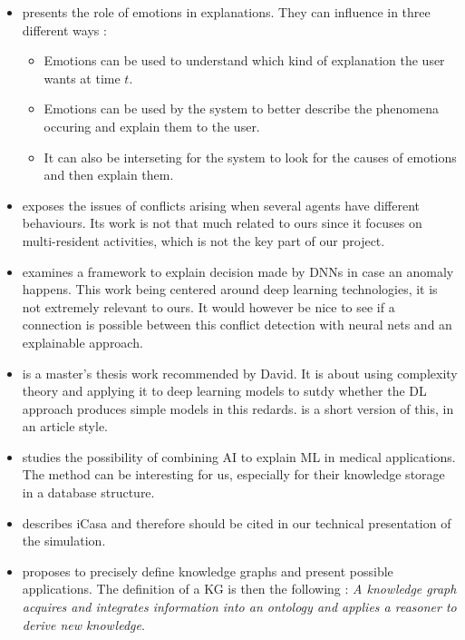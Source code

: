\documentclass{article}
\begin{document}
\begin{itemize}
    \item\citep{kaptein2017emotion} presents the role of emotions in explanations. They can influence in three different ways :
    \begin{itemize}
        \item Emotions can be used to understand which kind of explanation the user wants at time $t$.
        \item Emotions can be used by the system to better describe the phenomena occuring and explain them to the user.
        \item It can also be interseting for the system to look for the causes of emotions and then explain them.
    \end{itemize}
    
    \item\citep{mohamed2017conflict} exposes the issues of conflicts arising when several agents have different behaviours. Its work is not that much related to ours since it focuses on multi-resident activities, which is not the key part of our project.

    \item\citep{amarasinghe2018toward} examines a framework to explain decision made by DNNs in case an anomaly happens. This work being centered around deep learning technologies, it is not extremely relevant to ours. It would however be nice to see if a connection is possible between this conflict detection with neural nets and an explainable approach.

    \item\citep{blier2017universal} is a master's thesis work recommended by David. It is about using complexity theory and applying it to deep learning models to sutdy whether the DL approach produces simple models in this redards. \citep{blierdescription} is a short version of this, in an article style.

    \item \citep{olson2018system} studies the possibility of combining AI to explain ML in medical applications. The method can be interesting for us, especially for their knowledge storage in a database structure.

    \item \citep{lalanda2014icasa} describes iCasa and therefore should be cited in our technical presentation of the simulation.

    \item \citep{ehrlinger2016towards} proposes to precisely define knowledge graphs and present possible applications. The definition of a KG is then the following : \emph{A knowledge graph acquires and integrates information into an ontology and applies a reasoner to derive new knowledge}.
    
    \end{itemize}
\end{document}
